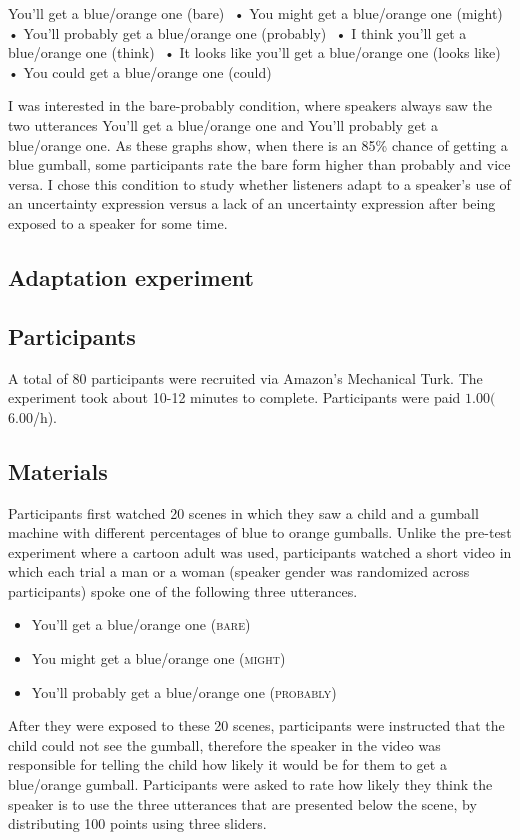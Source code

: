 \documentclass[lucida,biblatex]{sp} %
\begin{document}
You’ll get a blue/orange one (bare) 
•	You might get a blue/orange one (might)  
•	You’ll probably get a blue/orange one (probably) 
•	I think you’ll get a blue/orange one (think) 
•	It looks like you’ll get a blue/orange one (looks like) 
•	You could get a blue/orange one (could) 

I was interested in the bare-probably condition, where speakers always saw the two utterances You’ll get a blue/orange one and You’ll probably get a blue/orange one. As these graphs show, when there is an 85\% chance of getting a blue gumball, some participants rate the bare form higher than probably and vice versa. I chose this condition to study whether listeners adapt to a speaker’s use of an uncertainty expression versus a lack of an uncertainty expression after being exposed to a speaker for some time. 


\subsection{Adaptation experiment}

\subsection{Participants}
A total of 80 participants were recruited via Amazon’s Mechanical Turk. The experiment took about 10-12 minutes to complete. Participants were paid $1.00 ($6.00/h).

\subsection{Materials}


Participants first watched 20 scenes in which they saw a child and a gumball machine with different percentages of blue to orange gumballs. Unlike the pre-test experiment where a cartoon adult was used, participants watched a short video in which each trial a man or a woman (speaker gender was randomized across participants) spoke one of the following three utterances.

\begin{itemize}
\item You'll get a blue/orange one (\textsc{bare})
\item You might get a blue/orange one (\textsc{might})
\item You'll probably get a blue/orange one (\textsc{probably})
\end{itemize}

After they were exposed to these 20 scenes, participants were instructed that the child could not see the gumball, therefore the speaker in the video was responsible for telling the child how likely it would be for them to get a blue/orange gumball. Participants were asked to rate how likely they think the speaker is to use the three utterances that are presented below the scene, by distributing 100 points using three sliders.
\end{document}
